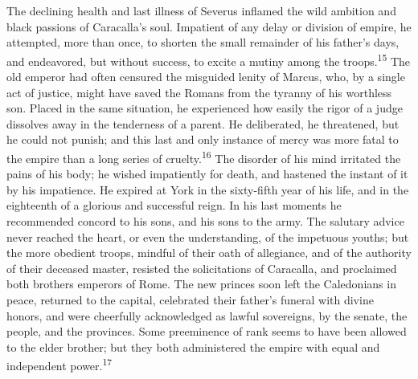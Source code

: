 The declining health and last illness of Severus inflamed the
wild ambition and black passions of Caracalla’s soul. Impatient
of any delay or division of empire, he attempted, more than once,
to shorten the small remainder of his father’s days, and
endeavored, but without success, to excite a mutiny among the
troops.\textsuperscript{15} The old emperor had often censured the misguided
lenity of Marcus, who, by a single act of justice, might have
saved the Romans from the tyranny of his worthless son. Placed in
the same situation, he experienced how easily the rigor of a
judge dissolves away in the tenderness of a parent. He
deliberated, he threatened, but he could not punish; and this
last and only instance of mercy was more fatal to the empire than
a long series of cruelty.\textsuperscript{16} The disorder of his mind irritated
the pains of his body; he wished impatiently for death, and
hastened the instant of it by his impatience. He expired at York
in the sixty-fifth year of his life, and in the eighteenth of a
glorious and successful reign. In his last moments he recommended
concord to his sons, and his sons to the army. The salutary
advice never reached the heart, or even the understanding, of the
impetuous youths; but the more obedient troops, mindful of their
oath of allegiance, and of the authority of their deceased
master, resisted the solicitations of Caracalla, and proclaimed
both brothers emperors of Rome. The new princes soon left the
Caledonians in peace, returned to the capital, celebrated their
father’s funeral with divine honors, and were cheerfully
acknowledged as lawful sovereigns, by the senate, the people, and
the provinces. Some preeminence of rank seems to have been
allowed to the elder brother; but they both administered the
empire with equal and independent power.\textsuperscript{17}





